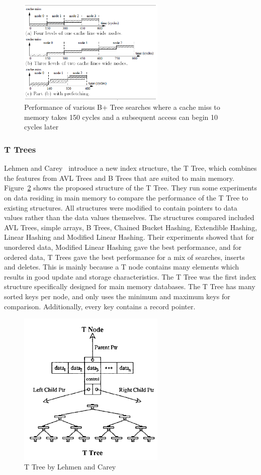 \documentclass[12pt,a4paper]{article}
\begin{document}
\begin{figure}[!t]
\centering
\includegraphics[width=7cm]{figs/prefetching.png}
\caption{Performance of various B+ Tree searches where a cache miss to memory takes 150 cycles and a subsequent access can begin 10 cycles
later~\cite{chen2001improving}}
\label{fig:prefetching}
\end{figure}

\subsubsection*{T Trees}
Lehmen and Carey~\cite{lehman1986study} introduce a new index structure, the T Tree, which combines the features from AVL Trees and B Trees that are suited to
main memory. Figure~\ref{fig:ttree} shows the proposed structure of the T Tree. They run some experiments on data residing in main memory to compare the
performance of the T
Tree to existing structures. All structures were modified to contain pointers to data values rather than the data values themselves. The structures
compared included  AVL Trees, simple arrays, B Trees, Chained Bucket Hashing, Extendible Hashing, Linear Hashing and Modified Linear Hashing. Their
experiments showed that for unordered data, Modified Linear Hashing gave the best performance, and for ordered data, T Trees gave the best performance for a mix
of searches, inserts and deletes. This is mainly because a T node contains many elements which results in good update and storage characteristics. The T Tree
was the first index structure specifically designed for main memory databases. The T Tree has many sorted keys per node, and only uses the minimum and maximum
keys for comparison. Additionally, every key contains a record pointer.



\begin{figure}[!t]
\centering
\includegraphics[width=7cm]{figs/Ttree.png}
\caption{T Tree by Lehmen and Carey~\cite{lehman1986study}}
\label{fig:ttree}
\end{figure}
\end{document}
